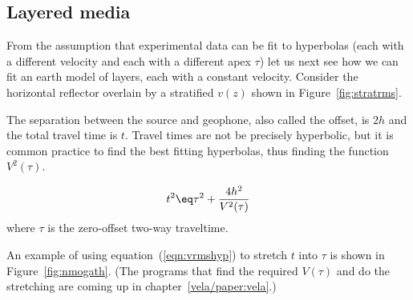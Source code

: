 \subsection{Layered media}
\par
From the assumption that experimental data
can be fit to hyperbolas
(each with a different velocity and each with a different apex $\tau$)
let us next see how
we can fit an earth model of layers,
each with a constant velocity.
Consider the  horizontal reflector
overlain by a stratified  $v(z)$ 
shown in Figure~\ref{fig:stratrms}.%

The separation between the source and geophone,
also called the offset, is $2h$ and the total travel time is $t$.
Travel times are not be precisely hyperbolic,
but it is common practice to find the best fitting hyperbolas,
thus finding the function $V^2(\tau)$.

\begin{equation}
t^2 \eq \tau^2 + \frac{4h^2}{V^2(\tau)}
\label{eqn:vrmshyp}
\end{equation}
where $\tau$ is the zero-offset two-way traveltime.

\par
An example of using equation~(\ref{eqn:vrmshyp})
to stretch $t$ into $\tau$
is shown in Figure~\ref{fig:nmogath}.
(The programs that
find the required $V(\tau )$ and do the stretching are coming up in
chapter~\ref{vela/paper:vela}.)


